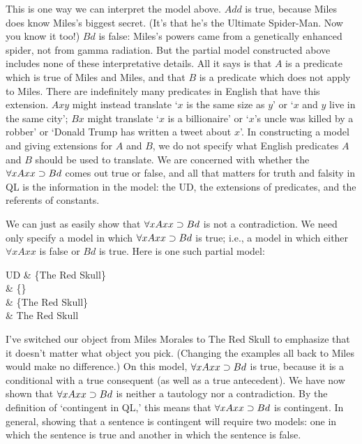 This is one way we can interpret the model above. $Add$ is true, because Miles does know Miles's biggest secret. (It's that he's the Ultimate Spider-Man. Now you know it too!) $Bd$ is false: Miles's powers came from a genetically enhanced spider, not from gamma radiation. But the partial model constructed above includes none of these interpretative details. All it says is that $A$ is a predicate which is true of Miles and Miles, and that $B$ is a predicate which does not apply to Miles. There are indefinitely many predicates in English that have this extension. $Axy$ might instead translate `$x$ is the same size as $y$' or `$x$ and $y$ live in the same city'; $Bx$ might  translate `$x$ is a billionaire' or `$x$'s uncle was killed by a robber' or `Donald Trump has written a tweet about $x$'. In constructing a model and giving extensions for $A$ and $B$, we do not specify what English predicates $A$ and $B$ should be used to translate. We are concerned with whether the $\forall xAxx \supset Bd$ comes out true or false, and all that matters for truth and falsity in QL is the information in the model: the UD, the extensions of predicates, and the referents of constants.

We can just as easily show that $\forall xAxx \supset Bd$ is not a contradiction. We need only specify a model in which $\forall xAxx \supset Bd$ is true; i.e., a model in which either $\forall x Axx$ is false or $Bd$ is true. Here is one such partial model:

\begin{partialmodel}
	UD			& \{The Red Skull\}\\
	 	& \{\}\\
		& \{The Red Skull\}\\
		& The Red Skull
\end{partialmodel}

I've switched our object from Miles Morales to The Red Skull to emphasize that it doesn't matter what object you pick. (Changing the examples all back to Miles would make no difference.) On this model, $\forall xAxx \supset Bd$ is true, because it is a conditional with a true consequent (as well as a true antecedent). We have now shown that $\forall xAxx \supset Bd$ is neither a tautology nor a contradiction. By the definition of `contingent in QL,' this means that 
$\forall xAxx \supset Bd$ is contingent. In general, showing that a sentence is contingent will require two models: one in which the sentence is true and another in which the sentence is false.

